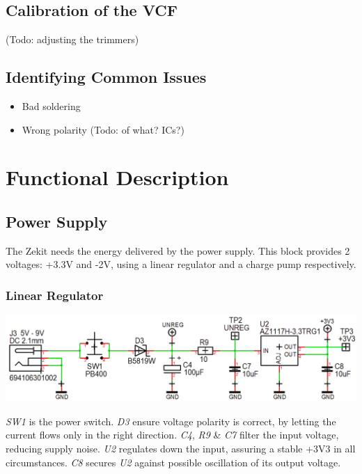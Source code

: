 \documentclass{scrartcl}
\begin{document}
\subsection{Calibration of the VCF}

(Todo: adjusting the trimmers)

\subsection{Identifying Common Issues}

\begin{itemize}
    \item Bad soldering
    \item Wrong polarity (Todo: of what? ICs?)
\end{itemize}

\pagebreak


\section{Functional Description}

\subsection{Power Supply}

The Zekit needs the energy delivered by the power supply. This block provides 2 voltages: +3.3V and -2V, using a linear regulator and a charge pump respectively.

\subsubsection{Linear Regulator}

\begin{center}
    \includegraphics[scale=0.4]{assets/schema-power.png}
\end{center}

\emph{SW1} is the power switch. \emph{D3} ensure voltage polarity is correct, by letting the current flows only in the right direction. \emph{C4}, \emph{R9} \& \emph{C7} filter the input voltage, reducing supply noise. \emph{U2} regulates down the input, assuring a stable +3V3 in all circumstances. \emph{C8} secures \emph{U2} against possible oscillation of its output voltage.
\end{document}
